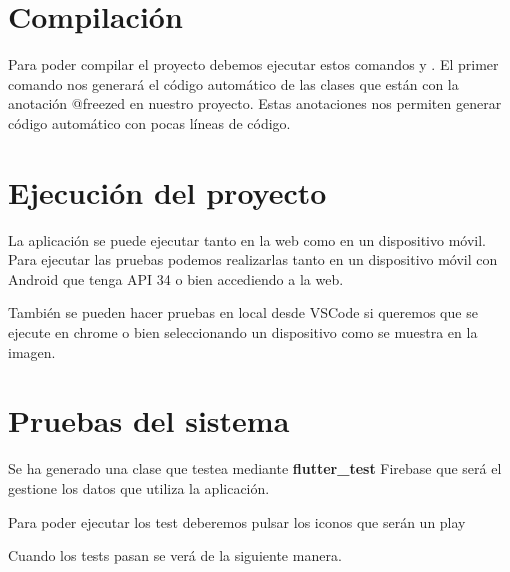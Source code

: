 \section{Compilación}
Para poder compilar el proyecto debemos ejecutar estos comandos \fboxrule=1pt\fboxsep=4pt y \fboxrule=1pt\fboxsep=4pt. El primer comando nos generará el código automático de las clases que están con la anotación @freezed en nuestro proyecto. Estas anotaciones nos permiten generar código automático con pocas líneas de código.

\section{Ejecución del proyecto}
La aplicación se puede ejecutar tanto en la web como en un dispositivo móvil. Para ejecutar las pruebas podemos realizarlas tanto en un dispositivo móvil con Android que tenga API 34 o bien accediendo a la web.

También se pueden hacer pruebas en local desde VSCode \fboxrule=1pt\fboxsep=4pt si queremos que se ejecute en chrome o bien seleccionando un dispositivo como se muestra en la imagen.

\section{Pruebas del sistema}
Se ha generado una clase que testea mediante \textbf{flutter\_test} Firebase que será el gestione los datos que utiliza la aplicación.

Para poder ejecutar los test deberemos pulsar los iconos que serán un play

Cuando los tests pasan se verá de la siguiente manera.
